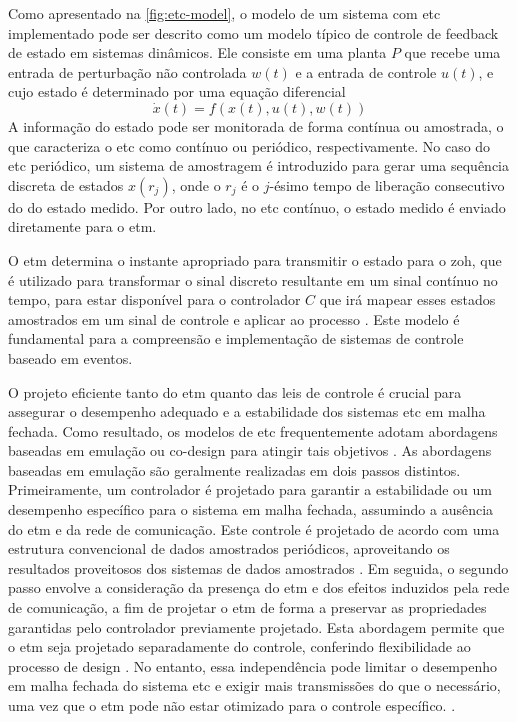 Como apresentado na \autoref{fig:etc-model}, o modelo de um sistema com \acrshort{etc} implementado pode ser descrito como um modelo típico de controle de feedback de estado em sistemas dinâmicos. Ele consiste em uma planta $P$ que recebe uma entrada de perturbação não controlada $w(t)$ e a entrada de controle $u(t)$, e cujo estado é determinado por uma equação diferencial \begin{equation}\dot{x}(t) = f(x(t), u(t), w(t))\end{equation} A informação do estado pode ser monitorada de forma contínua ou amostrada, o que caracteriza o \acrshort{etc} como contínuo ou periódico, respectivamente. No caso do \acrshort{etc} periódico, um sistema de amostragem é introduzido para gerar uma sequência discreta de estados $x(r_j)$, onde o $r_j$ é  o $j$-ésimo tempo de liberação consecutivo do do estado medido. Por outro lado, no \acrshort{etc} contínuo, o estado medido é enviado diretamente para o \acrshort{etm}. \cite{peng2018,coutinho2021,Lemmon2010}

O \acrshort{etm} determina o instante apropriado para transmitir o estado para o \acrfull{zoh}, que é utilizado para transformar o sinal discreto resultante em um sinal contínuo no tempo,  para estar disponível para o controlador $C$ que irá mapear esses estados amostrados em um sinal de controle e aplicar ao processo \cite{coutinho2021}. Este modelo é fundamental para a compreensão e implementação de sistemas de controle baseado em eventos.

O projeto eficiente tanto do \acrshort{etm} quanto das leis de controle é crucial para assegurar o desempenho adequado e a estabilidade dos sistemas \acrshort{etc} em malha fechada. Como resultado, os modelos de \acrshort{etc} frequentemente adotam abordagens baseadas em emulação ou co-design para atingir tais objetivos \cite{coutinho2021, peng2018}. As abordagens baseadas em emulação são geralmente realizadas em dois passos distintos. Primeiramente, um controlador é projetado para garantir a estabilidade ou um desempenho específico para o sistema em malha fechada, assumindo a ausência do \acrshort{etm} e da rede de comunicação. Este controle é projetado de acordo com uma estrutura convencional de dados amostrados periódicos, aproveitando os resultados proveitosos dos sistemas de dados amostrados \cite{coutinho2021,peng2018}. Em seguida, o segundo passo envolve a consideração da presença do \acrshort{etm} e dos efeitos induzidos pela rede de comunicação, a fim de projetar o \acrshort{etm} de forma a preservar as propriedades garantidas pelo controlador previamente projetado. Esta abordagem permite que o \acrshort{etm} seja projetado separadamente do controle, conferindo flexibilidade ao processo de design \cite{coutinho2021,peng2018}. No entanto, essa independência pode limitar o desempenho em malha fechada do sistema \acrshort{etc} e exigir mais transmissões do que o necessário, uma vez que o \acrshort{etm} pode não estar otimizado para o controle específico. \cite{coutinho2021}.


